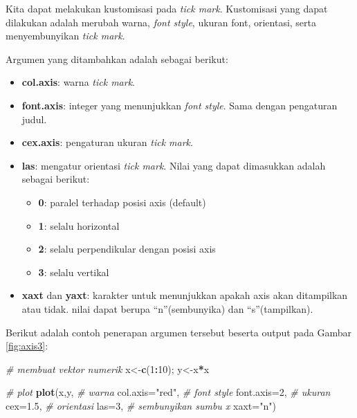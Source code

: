 \documentclass[
]{book}
\newenvironment{Shaded}{\begin{snugshade}}{\end{snugshade}}
\newcommand{\AttributeTok}[1]{\textcolor[rgb]{0.13,0.29,0.53}{#1}}
\newcommand{\CommentTok}[1]{\textcolor[rgb]{0.56,0.35,0.01}{\textit{#1}}}
\newcommand{\DecValTok}[1]{\textcolor[rgb]{0.00,0.00,0.81}{#1}}
\newcommand{\FloatTok}[1]{\textcolor[rgb]{0.00,0.00,0.81}{#1}}
\newcommand{\FunctionTok}[1]{\textcolor[rgb]{0.13,0.29,0.53}{\textbf{#1}}}
\newcommand{\NormalTok}[1]{#1}
\newcommand{\OtherTok}[1]{\textcolor[rgb]{0.56,0.35,0.01}{#1}}
\newcommand{\SpecialCharTok}[1]{\textcolor[rgb]{0.81,0.36,0.00}{\textbf{#1}}}
\newcommand{\StringTok}[1]{\textcolor[rgb]{0.31,0.60,0.02}{#1}}
\providecommand{\tightlist}{%
  \setlength{\itemsep}{0pt}\setlength{\parskip}{0pt}}
\theoremstyle{definition}
\theoremstyle{definition}
\theoremstyle{definition}
\theoremstyle{definition}
\theoremstyle{remark}
\begin{document}
Kita dapat melakukan kustomisasi pada \emph{tick mark}. Kustomisasi yang dapat dilakukan adalah merubah warna, \emph{font style}, ukuran font, orientasi, serta menyembunyikan \emph{tick mark}.

Argumen yang ditambahkan adalah sebagai berikut:

\begin{itemize}
\item
  \textbf{col.axis}: warna \emph{tick mark}.
\item
  \textbf{font.axis}: integer yang menunjukkan \emph{font style}. Sama dengan pengaturan judul.
\item
  \textbf{cex.axis}: pengaturan ukuran \emph{tick mark}.
\item
  \textbf{las}: mengatur orientasi \emph{tick mark}. Nilai yang dapat dimasukkan adalah sebagai berikut:

  \begin{itemize}
  \tightlist
  \item
    \textbf{0}: paralel terhadap posisi axis (default)
  \item
    \textbf{1}: selalu horizontal
  \item
    \textbf{2}: selalu perpendikular dengan posisi axis
  \item
    \textbf{3}: selalu vertikal
  \end{itemize}
\item
  \textbf{xaxt} dan \textbf{yaxt}: karakter untuk menunjukkan apakah axis akan ditampilkan atau tidak. nilai dapat berupa ``n''(sembunyika) dan ``s''(tampilkan).
\end{itemize}

Berikut adalah contoh penerapan argumen tersebut beserta output pada Gambar \ref{fig:axis3}:

\begin{Shaded}
\begin{Highlighting}[]
\CommentTok{\# membuat vektor numerik}
\NormalTok{x}\OtherTok{\textless{}{-}}\FunctionTok{c}\NormalTok{(}\DecValTok{1}\SpecialCharTok{:}\DecValTok{10}\NormalTok{); y}\OtherTok{\textless{}{-}}\NormalTok{x}\SpecialCharTok{*}\NormalTok{x}

\CommentTok{\# plot}
\FunctionTok{plot}\NormalTok{(x,y,}
     \CommentTok{\# warna}
     \AttributeTok{col.axis=}\StringTok{"red"}\NormalTok{,}
     \CommentTok{\# font style}
     \AttributeTok{font.axis=}\DecValTok{2}\NormalTok{,}
     \CommentTok{\# ukuran}
     \AttributeTok{cex=}\FloatTok{1.5}\NormalTok{,}
     \CommentTok{\# orientasi}
     \AttributeTok{las=}\DecValTok{3}\NormalTok{,}
     \CommentTok{\# sembunyikan sumbu x}
     \AttributeTok{xaxt=}\StringTok{"n"}\NormalTok{)}
\end{Highlighting}
\end{Shaded}
\end{document}
